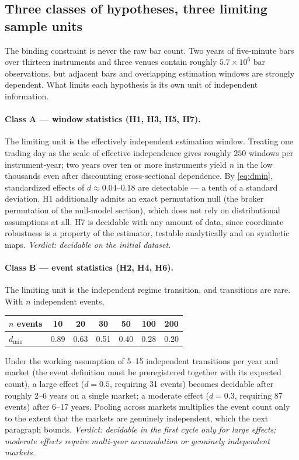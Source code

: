 \documentclass[11pt,a4paper]{article}
\numberwithin{equation}{section}
\begin{document}
\subsection{Three classes of hypotheses, three limiting sample
units}

The binding constraint is never the raw bar count. Two years of
five-minute bars over thirteen instruments and three venues contain
roughly $5.7\times10^6$ bar observations, but adjacent bars and
overlapping estimation windows are strongly dependent. What limits
each hypothesis is its own unit of independent information.

\paragraph{Class A --- window statistics (H1, H3, H5, H7).}
The limiting unit is the effectively independent estimation window.
Treating one trading day as the scale of effective independence
gives roughly $250$ windows per instrument-year; two years over ten
or more instruments yield $n$ in the low thousands even after
discounting cross-sectional dependence. By \eqref{eq:dmin},
standardized effects of $d\approx0.04$--$0.18$ are detectable ---
a tenth of a standard deviation. H1 additionally admits an exact
permutation null (the broker permutation of the null-model
section), which does not rely on distributional assumptions at all.
H7 is decidable with any amount of data, since coordinate
robustness is a property of the estimator, testable analytically
and on synthetic maps. \emph{Verdict: decidable on the initial
dataset.}

\paragraph{Class B --- event statistics (H2, H4, H6).}
The limiting unit is the independent regime transition, and
transitions are rare. With $n$ independent events,
\begin{center}
\begin{tabular}{lcccccc}
\toprule
$n$ events & 10 & 20 & 30 & 50 & 100 & 200\\
\midrule
$d_{\min}$ & 0.89 & 0.63 & 0.51 & 0.40 & 0.28 & 0.20\\
\bottomrule
\end{tabular}
\end{center}
Under the working assumption of 5--15 independent transitions per
year and market (the event definition must be preregistered
together with its expected count), a large effect ($d=0.5$,
requiring 31 events) becomes decidable after roughly 2--6 years on
a single market; a moderate effect ($d=0.3$, requiring 87 events)
after 6--17 years. Pooling across markets multiplies the event
count only to the extent that the markets are genuinely
independent, which the next paragraph bounds. \emph{Verdict:
decidable in the first cycle only for large effects; moderate
effects require multi-year accumulation or genuinely independent
markets.}
\end{document}
